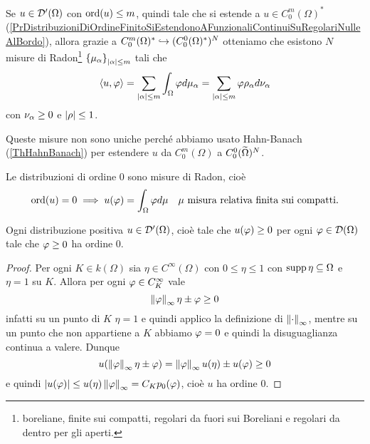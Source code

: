 \begin{fact}
Se $u\in \mathcal{D}'(\Omega)$ con $\operatorname{ord}(u)\leq m$, quindi tale che si estende a $u\in C^m_0(\Omega)^\ast$ (\ref{PrDistribuzioniDiOrdineFinitoSiEstendonoAFunzionaliContinuiSuRegolariNulleAlBordo}), allora grazie a $C^m_0(\Omega)^\ast\hookrightarrow (C^0_0(\Omega)^\ast)^N$ otteniamo che esistono $N$ misure di Radon\footnote{boreliane, finite sui compatti, regolari da fuori sui Boreliani e regolari da dentro per gli aperti.} $\left\{{\mu_\alpha}\right\}_{\left|{\alpha}\right|\leq m}$ tali che
\[\left\langle {u,\varphi}\right\rangle=\sum_{\left|{\alpha}\right|\leq m}\int_\Omega \varphi d\mu_\alpha=\sum_{\left|{\alpha}\right|\leq m}\varphi\rho_\alpha d\nu_\alpha\]
con $\nu_\alpha\geq 0$ e $\left|{\rho}\right|\leq 1$.
\end{fact}

\begin{remark}
Queste misure non sono uniche perch\'e abbiamo usato Hahn-Banach (\ref{ThHahnBanach}) per estendere $u$ da $C^m_0(\Omega)$ a $C^0_0(\widetilde{\Omega})^N$.
\end{remark}


\begin{remark}
Le distribuzioni di ordine $0$ sono misure di Radon, cio\`e
\[\operatorname{ord}(u)=0\implies u(\varphi)=\int_\Omega\varphi d\mu\quad \mu\text{ misura relativa finita sui compatti.}\]
\end{remark}

\begin{fact}
    Ogni distribuzione positiva $u\in \mathcal{D}'(\Omega)$, cio\`e tale che $u(\varphi)\geq 0$ per ogni $\varphi\in \mathcal{D}(\Omega)$ tale che $\varphi\geq 0$ ha ordine 0.
\end{fact}
\begin{proof}
Per ogni $K\in k(\Omega)$ sia $\eta\in C^\infty(\Omega)$ con $0\leq \eta\leq 1$ con $\operatorname{supp}\eta\subseteq \Omega$ e $\eta=1$ su $K$. Allora per ogni $\varphi\in C^\infty_K$ vale
\[\left\Vert{\varphi}\right\Vert_\infty\eta\pm \varphi\geq 0\]
infatti su un punto di $K$ $\eta=1$ e quindi applico la definizione di ${\left\Vert{\cdot}\right\Vert}_\infty$, mentre su un punto che non appartiene a $K$ abbiamo $\varphi=0$ e quindi la disuguaglianza continua a valere.
Dunque 
\[u(\left\Vert{\varphi}\right\Vert_\infty\eta\pm\varphi)=\left\Vert{\varphi}\right\Vert_\infty u(\eta)\pm u(\varphi)\geq 0\]
e quindi $\left|{u(\varphi)}\right|\leq u(\eta)\left\Vert{\varphi}\right\Vert_\infty=C_Kp_0(\varphi)$, cio\`e $u$ ha ordine $0$.
\end{proof}


